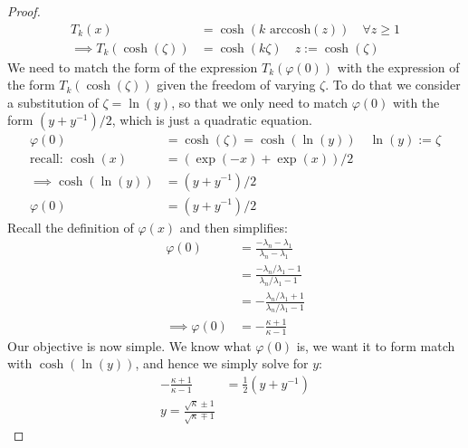 \documentclass[]{article}
\theoremstyle{definition}
\begin{document}
\begin{proof}
                \begin{align}
                    T_k(x) &= \cosh(k\text{ arccosh}(z)) \quad \forall z \ge 1
                    \\
                    \implies
                    T_k(\cosh(\zeta)) &= \cosh(k\zeta) \quad z := \cosh(\zeta)
                \end{align}
                We need to match the form of the expression $T_k(\varphi(0))$ with the expression of the form $T_k(\cosh(\zeta))$ given the freedom of varying $\zeta$. To do that we consider a substitution of $\zeta = \ln(y)$, so that we only need to match $\varphi(0)$ with the form $(y + y^{-1})/2$, which is just a quadratic equation. 
                \begin{align}
                    \varphi(0) &= \cosh(\zeta) = \cosh(\ln(y)) \quad \ln(y) := \zeta
                    \\
                    \text{recall: } \cosh(x) &= (\exp(-x) + \exp(x))/2
                    \\
                    \implies 
                    \cosh(\ln(y)) &= (y + y^{-1})/2
                    \\
                    \varphi(0) &= (y + y^{-1})/2
                \end{align}
                Recall the definition of $\varphi(x)$ and then simplifies: 
                $$
                \begin{aligned}
                    \varphi(0) &= \frac{-\lambda_n - \lambda_1}{\lambda_n - \lambda_1}
                    \\
                    &= \frac{-\lambda_n/\lambda_1 - 1}{\lambda_n/\lambda_1 - 1}
                    \\ 
                    &= - 
                    \frac{\lambda_n/\lambda_1 + 1}{\lambda_n/\lambda_1 - 1} 
                    \\
                    \implies \varphi(0) &=
                    -\frac{\kappa + 1}{\kappa - 1}
                \end{aligned}
                $$
                Our objective is now simple. We know what $\varphi(0)$ is, we want it to form match with $\cosh(\ln(y))$, and hence we simply solve for $y$: 
                \begin{align}
                    -\frac{\kappa + 1}{\kappa - 1} &= 
                    \frac{1}{2}(y + y^{-1})
                    \\
                    y = \frac{\sqrt{\kappa}\pm 1}{\sqrt{\kappa}\mp 1}

\end{align}
\end{proof}
\end{document}

